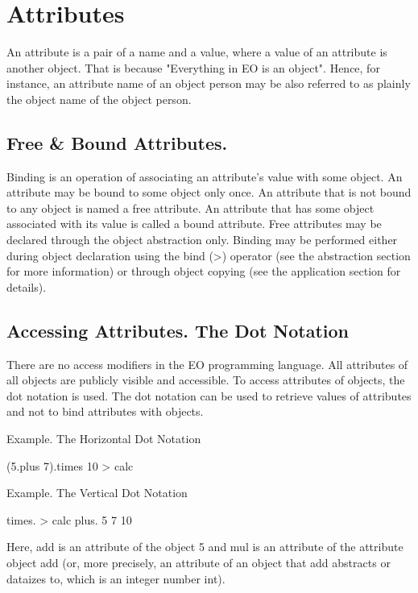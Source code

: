 \documentclass[12pt]{book}
\begin{document}
\section{Attributes}
An attribute is a pair of a name and a value, where a value of an attribute is another object. That is because "Everything in EO is an object". Hence, for instance, an attribute name of an object person may be also referred to as plainly the object name of the object person.

\subsection{Free \& Bound Attributes.}
Binding is an operation of associating an attribute's value with some object. An attribute may be bound to some object only once.
An attribute that is not bound to any object is named a free attribute. An attribute that has some object associated with its value is called a bound attribute.
Free attributes may be declared through the object abstraction only. Binding may be performed either during object declaration using the bind (>) operator (see the abstraction section for more information) or through object copying (see the application section for details).

\subsection{Accessing Attributes. The Dot Notation}
There are no access modifiers in the EO programming language. All attributes of all objects are publicly visible and accessible. To access attributes of objects, the dot notation is used. The dot notation can be used to retrieve values of attributes and not to bind attributes with objects.


Example. The Horizontal Dot Notation
\begin{ffcode}
(5.plus 7).times 10 > calc
\end{ffcode}

Example. The Vertical Dot Notation
\begin{ffcode}
times. > calc
  plus.
    5
    7
  10
\end{ffcode}

Here, add is an attribute of the object 5 and mul is an attribute of the attribute object add (or, more precisely, an attribute of an object that add abstracts or dataizes to, which is an integer number int).
\end{document}
